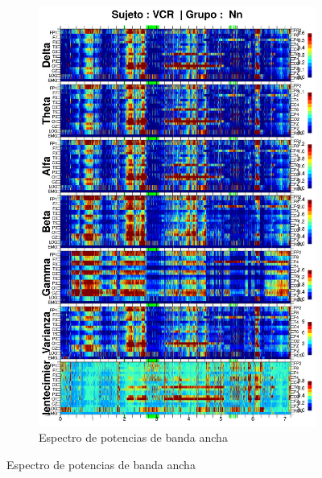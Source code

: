 \begin{figure}
\ContinuedFloat
\begin{subfigure}{\linewidth}
\centering
\includegraphics[width=0.9\linewidth]
{./enlentecimiento/VCNNS1_espectral_total.png} 
\caption{Espectro de potencias de banda ancha}
\end{subfigure}
\end{figure}


